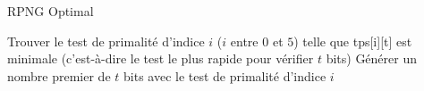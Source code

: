 			\begin{algorithm}[H]
				\caption{RPNG Optimal}\label{RPNG_opt}
				Trouver le test de primalité d'indice $i$ ($i$ entre $0$ et $5$) telle que tps[i][t] est minimale (c'est-à-dire le test le plus rapide pour vérifier $t$ bits)\;
				Générer un nombre premier de $t$ bits avec le test de primalité d'indice $i$\;
			\end{algorithm}
			~\\
